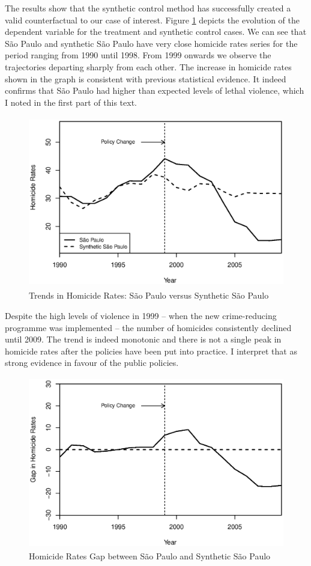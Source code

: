 The results show that the synthetic control method has successfully created a valid counterfactual to our case of interest. Figure \ref{fig:figure2} depicts the evolution of the dependent variable for the treatment and synthetic control cases. We can see that São Paulo and synthetic São Paulo have very close homicide rates series for the period ranging from 1990 until 1998. From 1999 onwards we observe the trajectories departing sharply from each other. The increase in homicide rates shown in the graph is consistent with previous statistical evidence. It indeed confirms that São Paulo had higher than expected levels of lethal violence, which I noted in the first part of this text.

\begin{figure}[H]
    \centering
    \includegraphics[height=7.5cm]{images/trends.eps}
    \caption{Trends in Homicide Rates: São Paulo versus Synthetic São Paulo}
    \label{fig:figure2}
\end{figure}

Despite the high levels of violence in 1999 -- when the new crime-reducing programme was implemented -- the number of homicides consistently declined until 2009. The trend is indeed monotonic and there is not a single peak in homicide rates after the policies have been put into practice. I interpret that as strong evidence in favour of the public policies. 

\begin{figure}[H]
    \centering
    \includegraphics[height=7.5cm]{images/gaps.eps}
    \caption{Homicide Rates Gap between São Paulo and Synthetic São Paulo}
    \label{fig:figure3}
\end{figure}

